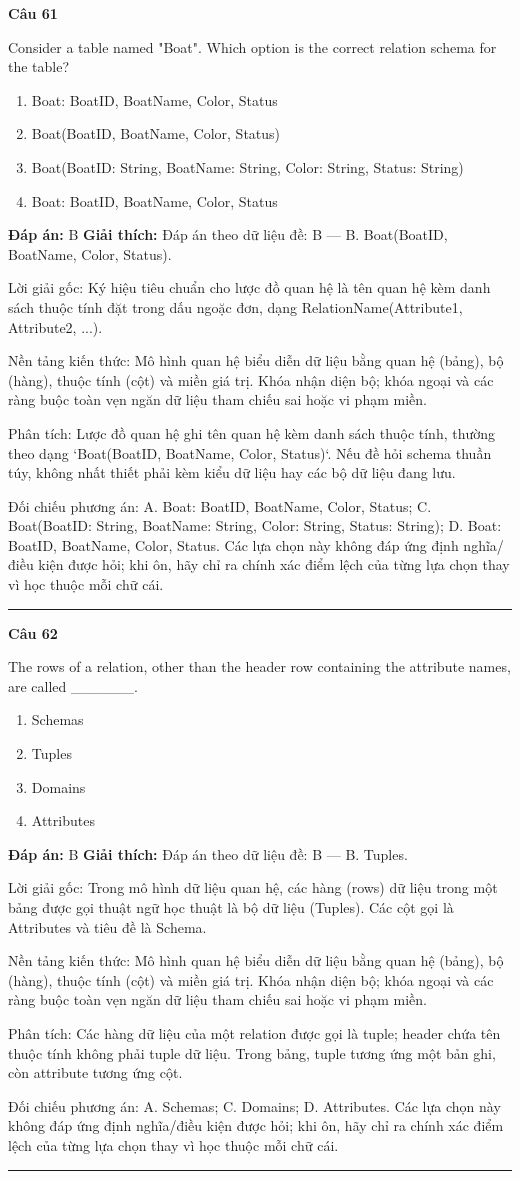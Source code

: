 \documentclass[11pt,a4paper]{article}
\newenvironment{question}[1]{%
  \par\vspace{1em}\noindent\textbf{\large Câu #1}\par\vspace{0.4em}
}{%
  \par\vspace{1em}\hrule\vspace{0.6em}
}
\newenvironment{choices}{%
  \begin{enumerate}[label=\textbf{\Alph*.},leftmargin=2.2em,itemsep=2pt,topsep=3pt]
}{%
  \end{enumerate}
}
\newcommand{\choice}{\item}
\begin{document}
\begin{question}{61}
Consider a table named "Boat". Which option is the correct relation schema for the table?
\begin{choices}
\choice Boat: BoatID, BoatName, Color, Status
\choice Boat(BoatID, BoatName, Color, Status)
\choice Boat(BoatID: String, BoatName: String, Color: String, Status: String)
\choice Boat: {BoatID, BoatName, Color, Status}
\end{choices}
\textbf{Đáp án:} B
\textbf{Giải thích:} Đáp án theo dữ liệu đề: B — B. Boat(BoatID, BoatName, Color, Status).

Lời giải gốc: Ký hiệu tiêu chuẩn cho lược đồ quan hệ là tên quan hệ kèm danh sách thuộc tính đặt trong dấu ngoặc đơn, dạng RelationName(Attribute1, Attribute2, ...).

Nền tảng kiến thức: Mô hình quan hệ biểu diễn dữ liệu bằng quan hệ (bảng), bộ (hàng), thuộc tính (cột) và miền giá trị. Khóa nhận diện bộ; khóa ngoại và các ràng buộc toàn vẹn ngăn dữ liệu tham chiếu sai hoặc vi phạm miền.

Phân tích: Lược đồ quan hệ ghi tên quan hệ kèm danh sách thuộc tính, thường theo dạng `Boat(BoatID, BoatName, Color, Status)`. Nếu đề hỏi schema thuần túy, không nhất thiết phải kèm kiểu dữ liệu hay các bộ dữ liệu đang lưu.

Đối chiếu phương án: A. Boat: BoatID, BoatName, Color, Status; C. Boat(BoatID: String, BoatName: String, Color: String, Status: String); D. Boat: {BoatID, BoatName, Color, Status}. Các lựa chọn này không đáp ứng định nghĩa/điều kiện được hỏi; khi ôn, hãy chỉ ra chính xác điểm lệch của từng lựa chọn thay vì học thuộc mỗi chữ cái.
\end{question}

\begin{question}{62}
The rows of a relation, other than the header row containing the attribute names, are called ______.
\begin{choices}
\choice Schemas
\choice Tuples
\choice Domains
\choice Attributes
\end{choices}
\textbf{Đáp án:} B
\textbf{Giải thích:} Đáp án theo dữ liệu đề: B — B. Tuples.

Lời giải gốc: Trong mô hình dữ liệu quan hệ, các hàng (rows) dữ liệu trong một bảng được gọi thuật ngữ học thuật là bộ dữ liệu (Tuples). Các cột gọi là Attributes và tiêu đề là Schema.

Nền tảng kiến thức: Mô hình quan hệ biểu diễn dữ liệu bằng quan hệ (bảng), bộ (hàng), thuộc tính (cột) và miền giá trị. Khóa nhận diện bộ; khóa ngoại và các ràng buộc toàn vẹn ngăn dữ liệu tham chiếu sai hoặc vi phạm miền.

Phân tích: Các hàng dữ liệu của một relation được gọi là tuple; header chứa tên thuộc tính không phải tuple dữ liệu. Trong bảng, tuple tương ứng một bản ghi, còn attribute tương ứng cột.

Đối chiếu phương án: A. Schemas; C. Domains; D. Attributes. Các lựa chọn này không đáp ứng định nghĩa/điều kiện được hỏi; khi ôn, hãy chỉ ra chính xác điểm lệch của từng lựa chọn thay vì học thuộc mỗi chữ cái.
\end{question}
\end{document}
